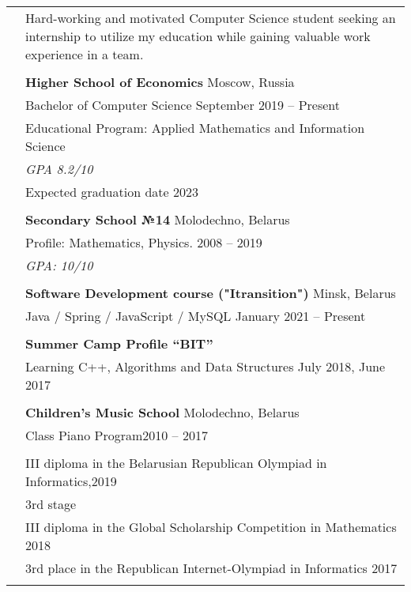 \documentclass[letterpaper, 11pt]{article}
\begin{document}
\begin{longtable}{p{1.3in}p{4.8in}}


\nohyphens{\color{OliveGreen}{Objective}}
& Hard-working and motivated Computer Science student seeking an internship to utilize my
education while gaining valuable work experience in a team. \\
& \\


\color{OliveGreen}{Education} 
& \textbf{Higher School of Economics} \hfill Moscow, Russia \\ 
& Bachelor of Computer Science \hfill September 2019 -- Present \\
& Educational Program: Applied Mathematics and Information Science\\
& {\it GPA 8.2/10}\\
& Expected graduation date 2023\\
& \\

& \textbf{Secondary School №14} \hfill Molodechno, Belarus \\
& Profile: Mathematics, Physics. \hfill 2008 -- 2019\\
& {\it GPA: 10/10}\\
& \\



{\color{OliveGreen}{Additional}}
& \textbf{Software Development course ("Itransition")} \hfill Minsk, Belarus\\
{\color{OliveGreen}{Education}} 
& Java / Spring / JavaScript / MySQL \hfill January 2021 -- Present\\
& \\

& \textbf{Summer Camp Profile “BIT”} \\
& Learning C++, Algorithms and Data Structures \hfill July 2018, June 2017 \\
& \\

& \textbf{Children’s Music School} \hfill Molodechno, Belarus\\
& Class Piano Program\hfill 2010 -- 2017\\
& \\


{\color{OliveGreen}{Aware and}} 
& III diploma in the Belarusian Republican Olympiad in Informatics,\hfill 2019\\
{\color{OliveGreen}{achievements}} 
& 3rd stage \\
& III diploma in the Global Scholarship Competition in Mathematics \hfill 2018\\
& 3rd place in the Republican Internet-Olympiad in Informatics  \hfill 2017\\
& \\


\end{longtable}
\end{document}
